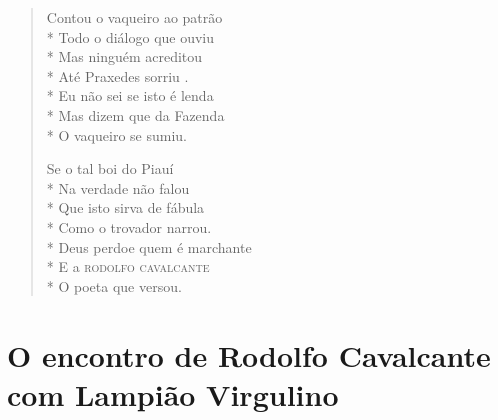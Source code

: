 \begin{verse}
Contou o vaqueiro ao patrão\\*
Todo o diálogo que ouviu\\*
Mas ninguém acreditou\\*
Até Praxedes sorriu .\\*
Eu não sei se isto é lenda\\*
Mas dizem que da Fazenda\\*
O vaqueiro se sumiu.

Se o tal boi do Piauí\\*
Na verdade não falou\\*
Que isto sirva de fábula\\*
Como o trovador narrou.\\*
Deus perdoe quem é marchante\\*
E a \textsc{rodolfo cavalcante}\\*
O poeta que versou.
\end{verse}

\chapter[O encontro de Rodolfo Cavalcante\\ com Lampião Virgulino]{O encontro de Rodolfo Cavalcante com Lampião Virgulino}

